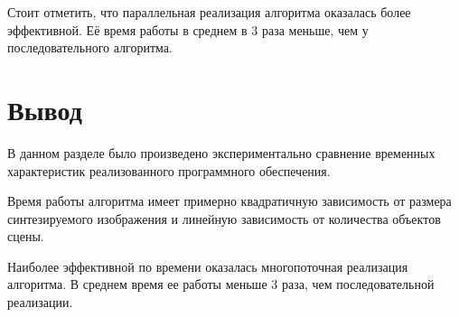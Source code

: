         Стоит отметить, что параллельная реализация алгоритма оказалась более эффективной. Её время работы в среднем в 3 раза меньше, чем у последовательного алгоритма.
        
\clearpage

    \section{Вывод}

        В данном разделе было произведено экспериментально сравнение временных характеристик реализованного программного обеспечения.
        
        Время работы алгоритма имеет примерно квадратичную зависимость от размера синтезируемого изображения и линейную зависимость от количества объектов сцены.
        
        Наиболее эффективной по времени оказалась многопоточная реализация алгоритма. В среднем время ее работы меньше 3 раза, чем последовательной реализации.